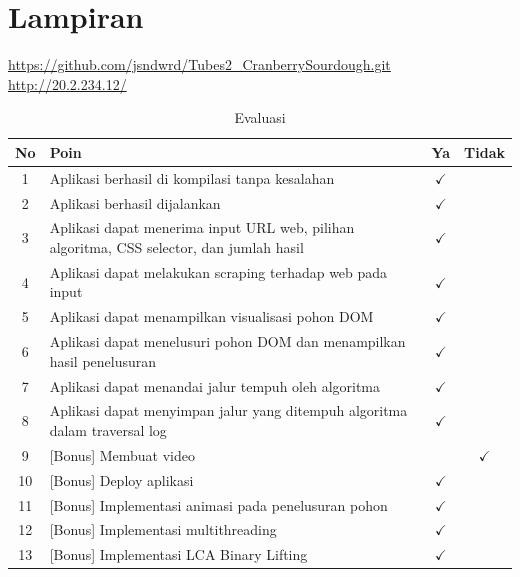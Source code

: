 \chapter{Lampiran}

\url{https://github.com/jsndwrd/Tubes2_CranberrySourdough.git}\\
\url{http://20.2.234.12/}\\


\begin{table}[H]
    \centering
    \caption{Evaluasi}
    \label{tab:checklist_eval}
    \renewcommand{\arraystretch}{1.5}
    \begin{tabular}{|c|p{10cm}|c|c|}
        \hline
        \textbf{No} & \centering \textbf{Poin} & \textbf{Ya} & \textbf{Tidak} \\ \hline
        1 & Aplikasi berhasil di kompilasi tanpa kesalahan & $\checkmark$ & \\ \hline
        2 & Aplikasi berhasil dijalankan & $\checkmark$ & \\ \hline
        3 & Aplikasi dapat menerima input URL web, pilihan algoritma, CSS selector, dan jumlah hasil & $\checkmark$ & \\ \hline
        4 & Aplikasi dapat melakukan scraping terhadap web pada input & $\checkmark$ & \\ \hline
        5 & Aplikasi dapat menampilkan visualisasi pohon DOM & $\checkmark$ & \\ \hline
        6 & Aplikasi dapat menelusuri pohon DOM dan menampilkan hasil penelusuran & $\checkmark$ & \\ \hline
        7 & Aplikasi dapat menandai jalur tempuh oleh algoritma & $\checkmark$ & \\ \hline
        8 & Aplikasi dapat menyimpan jalur yang ditempuh algoritma dalam traversal log & $\checkmark$ & \\ \hline
        9 & [Bonus] Membuat video & & $\checkmark$ \\ \hline
        10 & [Bonus] Deploy aplikasi & $\checkmark$ & \\ \hline
        11 & [Bonus] Implementasi animasi pada penelusuran pohon & $\checkmark$ & \\ \hline
        12 & [Bonus] Implementasi multithreading & $\checkmark$ & \\ \hline
        13 & [Bonus] Implementasi LCA Binary Lifting & $\checkmark$ & \\ \hline
    \end{tabular}
\end{table}